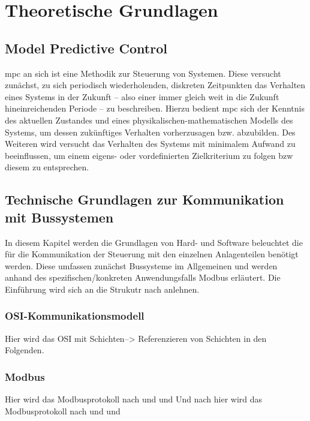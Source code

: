 \chapter{Theoretische Grundlagen}
\label{chap:theoretischegrundlagen}

\section{Model Predictive Control}
\label{chap:mpc}


\acrlong{mpc} an sich ist eine Methodik zur Steuerung von Systemen. Diese versucht zunächst, zu sich periodisch wiederholenden, diskreten Zeitpunkten das Verhalten eines Systems in der Zukunft -- also einer immer gleich weit in die Zukunft hineinreichenden Periode -- zu beschreiben. Hierzu bedient \acrlong{mpc} sich der Kenntnis des aktuellen Zustandes und eines physikalischen-mathematischen Modells des Systems, um dessen zukünftiges Verhalten \Gun vorherzusagen \Gob bzw. abzubilden. Des Weiteren wird versucht das Verhalten des Systems mit minimalem Aufwand zu beeinflussen, um einem eigens- oder vordefinierten Zielkriterium zu folgen \acrlong{bzw} diesem zu entsprechen.




\section{Technische Grundlagen zur Kommunikation mit Bussystemen}
\label{sec:grundlagenbus}
In diesem Kapitel werden die Grundlagen von Hard- und Software beleuchtet die für die Kommunikation der Steuerung mit den einzelnen Anlagenteilen benötigt werden.
Diese umfassen zunächst Bussysteme im Allgemeinen und werden anhand des spezifischen/konkreten Anwendungsfalls Modbus erläutert.
Die Einführung wird sich an die Strukutr nach \cite{schn06} anlehnen.

\subsection{OSI-Kommunikationsmodell}
Hier wird das OSI mit Schichten--> Referenzieren von Schichten in den Folgenden.

\subsection{Modbus}
Hier wird das Modbusprotokoll nach \cite{mod12} und \cite{mod06ser} und \cite{mod06tcp}  
Und nach hier wird das Modbusprotokoll nach \cite[S.5]{mod12} und \cite[S.5]{mod06ser} und \cite[S.5]{mod06tcp}

